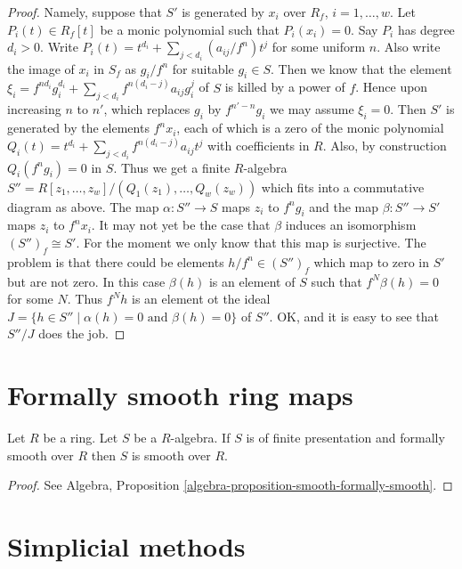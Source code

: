 \begin{proof}
Namely, suppose that $S'$ is generated by
$x_i$ over $R_f$, $i = 1, \ldots, w$. Let $P_i(t) \in R_f[t]$
be a monic polynomial such that $P_i(x_i) = 0$.
Say $P_i$ has degree $d_i > 0$. Write
$P_i(t) = t^{d_i} + \sum_{j < d_i} (a_{ij}/f^n) t^j$
for some uniform $n$. Also write
the image of $x_i$ in $S_f$ as $g_i / f^n$
for suitable $g_i \in S$. Then we know
that the element
$\xi_i = f^{nd_i} g_i^{d_i} + \sum_{j < d_i} f^{n(d_i - j)} a_{ij} g_i^j$
of $S$ is killed by a power of $f$.
Hence upon increasing $n$ to $n'$, which replaces
$g_i$ by $f^{n' - n}g_i$ we may assume $\xi_i = 0$.
Then $S'$ is generated by the elements
$f^n x_i$, each of which is a zero of the
monic polynomial $Q_i(t) = t^{d_i} +
\sum_{j < d_i} f^{n(d_i - j)} a_{ij} t^j$
with coefficients in $R$. Also, by construction
$Q_i(f^ng_i) = 0$ in $S$. Thus we get a finite $R$-algebra
$S'' = R[z_1, \ldots, z_w]/(Q_1(z_1), \ldots, Q_w(z_w))$
which fits into a commutative diagram as above.
The map $\alpha : S'' \to S$ maps $z_i$ to $f^ng_i$ and
the map $\beta : S'' \to S'$ maps $z_i$ to $f^nx_i$.
It may not yet be the case that $\beta$ induces an
isomorphism $(S'')_f \cong S'$.
For the moment we only know that this map
is surjective. The problem is that there could be
elements $h/f^n \in (S'')_f$ which map to zero
in $S'$ but are not zero. In this case $\beta(h)$
is an element of $S$ such that $f^N \beta(h) = 0$
for some $N$. Thus $f^N h$ is an element ot the ideal
$J = \{h \in S'' \mid \alpha(h) = 0 \text{ and }
\beta(h) = 0\}$ of $S''$. OK, and it is easy to see that
$S''/J$ does the job.
\end{proof}


\section{Formally smooth ring maps}
\label{section-formally-smooth}

\begin{lemma}
\label{lemma-formally-smooth-smooth}
Let $R$ be a ring. Let $S$ be a $R$-algebra.
If $S$ is of finite presentation and formally smooth over $R$
then $S$ is smooth over $R$.
\end{lemma}

\begin{proof}
See Algebra, Proposition \ref{algebra-proposition-smooth-formally-smooth}.
\end{proof}


\section{Simplicial methods}
\label{section-simplicial}



